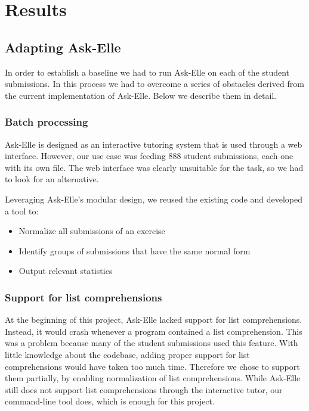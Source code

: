\chapter{Results}

\section{Adapting Ask-Elle}

In order to establish a baseline we had to run Ask-Elle on each of the student submissions. In this process we had to overcome a series of obstacles derived from the current implementation of Ask-Elle. Below we describe them in detail.

\subsection{Batch processing}

Ask-Elle is designed as an interactive tutoring system that is used through a web interface. However, our use case was feeding 888 student submissions, each one with its own file. The web interface was clearly unsuitable for the task, so we had to look for an alternative.

Leveraging Ask-Elle's modular design, we reused the existing code and developed a tool to:

\begin{itemize}
    \item Normalize all submissions of an exercise
    \item Identify groups of submissions that have the same normal form
    \item Output relevant statistics
\end{itemize}

\subsection{Support for list comprehensions}

At the beginning of this project, Ask-Elle lacked support for list comprehensions. Instead, it would crash whenever a program contained a list comprehension. This was a problem because many of the student submissions used this feature. With little knowledge about the codebase, adding proper support for list comprehensions would have taken too much time. Therefore we chose to support them partially, by enabling normalization of list comprehensions. While Ask-Elle still does not support list comprehensions through the interactive tutor, our command-line tool does, which is enough for this project.

